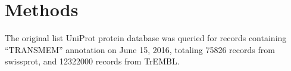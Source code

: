 \section{Methods}
The original list UniProt protein database was queried for records containing ``TRANSMEM'' annotation on June 15, 2016, totaling 75826 records from swissprot, and 12322000 records from TrEMBL.
